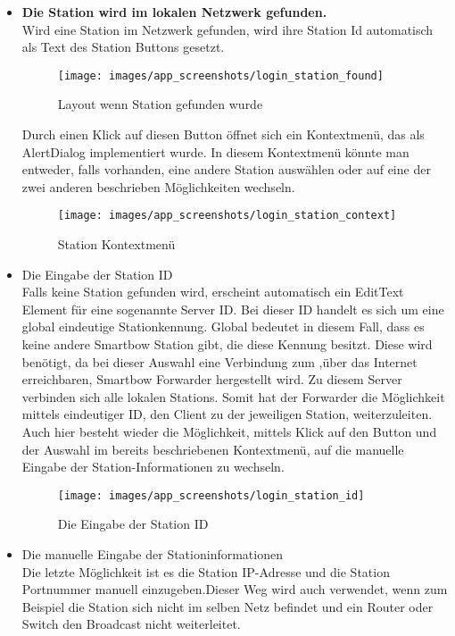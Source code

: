 \begin{itemize}
\item{\textbf{ Die Station wird im lokalen Netzwerk gefunden.}}\\
Wird eine Station im Netzwerk gefunden, wird ihre Station Id automatisch als Text des Station Buttons gesetzt. 
\begin{figure}[H]
\centering
\texttt{[image: images/app\_screenshots/login\_station\_found]}
\caption{Layout wenn Station gefunden wurde}
\end{figure}

Durch einen Klick auf diesen Button öffnet sich ein Kontextmenü, das als AlertDialog implementiert wurde. In diesem Kontextmenü könnte man entweder, falls vorhanden, eine andere Station auswählen oder auf eine der zwei anderen beschrieben Möglichkeiten wechseln. 

\begin{figure}[H]
\centering
\texttt{[image: images/app\_screenshots/login\_station\_context]}
\caption{Station Kontextmenü}
\end{figure}


\item{Die Eingabe der Station ID}\\
Falls keine Station gefunden wird, erscheint automatisch ein EditText Element für eine sogenannte Server ID. Bei dieser ID handelt es sich um eine global eindeutige Stationkennung. Global bedeutet in diesem Fall, dass es keine andere Smartbow Station gibt, die diese Kennung besitzt. Diese wird benötigt, da bei dieser Auswahl eine Verbindung zum ,über das Internet erreichbaren, Smartbow Forwarder hergestellt wird. Zu diesem Server verbinden sich alle lokalen Stations. Somit hat der Forwarder die Möglichkeit mittels eindeutiger ID, den Client zu der jeweiligen Station, weiterzuleiten.
Auch hier besteht wieder die Möglichkeit, mittels Klick auf den Button und der Auswahl im bereits beschriebenen Kontextmenü, auf die manuelle Eingabe der Station-Informationen zu wechseln.

\begin{figure}[H]
\centering
\texttt{[image: images/app\_screenshots/login\_station\_id]}
\caption{Die Eingabe der Station ID}
\end{figure}

\item{Die manuelle Eingabe der Stationinformationen}\\
Die letzte Möglichkeit ist es die Station IP-Adresse und die Station Portnummer manuell einzugeben.Dieser Weg wird auch verwendet, wenn zum Beispiel die Station sich nicht im selben Netz befindet und ein Router oder Switch den Broadcast nicht weiterleitet.


\end{itemize}
